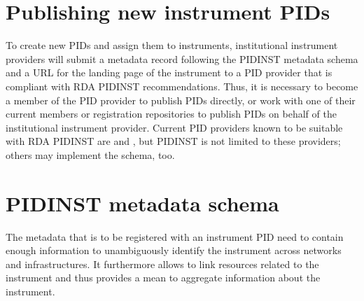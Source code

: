 \documentclass[a4paper,10pt,english]{sphinxmanual}
\begin{document}
\section{Publishing new instrument PIDs}
\label{\detokenize{white-paper/publishing:publishing-new-instrument-pids}}\label{\detokenize{white-paper/publishing::doc}}
To create new PIDs and assign them to instruments, institutional
instrument providers will submit a metadata record following the PIDINST
metadata schema and a URL for the landing page of the instrument to a
PID provider that is compliant with RDA PIDINST recommendations. Thus,
it is necessary to become a member of the PID provider to publish PIDs
directly, or work with one of their current members or registration
repositories to publish PIDs on behalf of the institutional instrument
provider. Current PID providers known to be suitable with RDA PIDINST
are  and , but PIDINST is not limited to these
providers; others may implement the schema, too.


\section{PIDINST metadata schema}
\label{\detokenize{white-paper/metadata-schema:pidinst-metadata-schema}}\label{\detokenize{white-paper/metadata-schema:id1}}\label{\detokenize{white-paper/metadata-schema::doc}}
The metadata that is to be registered with an instrument PID need to
contain enough information to unambiguously identify the
instrument across networks and infrastructures.  It furthermore allows
to link resources related to the instrument and thus provides a mean
to aggregate information about the instrument.
\end{document}
